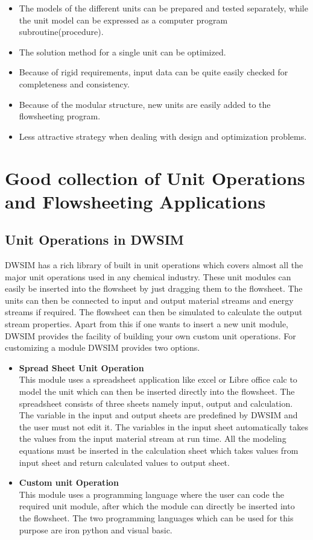 \documentclass[12pt]{report}
\begin{document}
\begin{itemize}
\item {The models of the different units can be prepared and tested separately, while the unit model can be expressed as a computer program subroutine(procedure).}
\item{The solution method for a single unit can be optimized.}
\item{Because of rigid requirements, input data can be quite easily checked for completeness and consistency.}
\item{Because of the modular structure, new units are easily added to the flowsheeting program.}
\item{Less attractive strategy when dealing with design and optimization problems.}
\end{itemize}

\section{Good collection of Unit Operations and Flowsheeting Applications}

\subsection{Unit Operations in DWSIM}

DWSIM has a rich library of built in unit operations which covers almost all the major unit operations used in any chemical industry. These unit modules can easily be inserted into the flowsheet by just dragging them to the flowsheet. The units can then be connected to input and output material streams and energy streams if required. The flowsheet can then be simulated to calculate the output stream properties.
Apart from this if one wants to insert a new unit module, DWSIM provides the facility of building your own custom unit operations. For customizing a module DWSIM provides two options.

\begin{itemize}
\item {\textbf{Spread Sheet Unit Operation}} \\
This module uses a spreadsheet application like excel or Libre office calc to model the unit which can then be inserted directly into the flowsheet. The spreadsheet consists of three sheets namely input, output and calculation. The variable in the input and output sheets are predefined by DWSIM and the user must not edit it. The variables in the input sheet automatically takes the values from the input material stream at run time. All the modeling equations must be inserted in the calculation sheet which takes values from input sheet and return calculated values to output sheet.
\item{\textbf{Custom unit Operation}} \\
This module uses a programming language where the user can code the required unit module, after which the module can directly be inserted into the flowsheet. The two programming languages which can be used for this purpose are iron python and visual basic.
\end{itemize}
\end{document}
